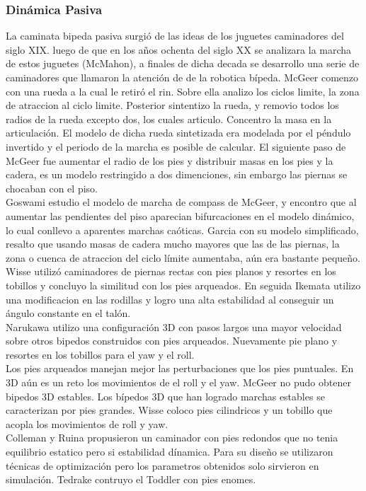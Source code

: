 \documentclass[10pt,onecolumn,twoside,letterpaper]{article}
\begin{document}
\subsubsection{Din\'amica Pasiva}
La caminata bipeda pasiva surgi\'o de las ideas de los juguetes caminadores del siglo XIX. luego de que en los a\~nos ochenta del siglo XX se analizara la marcha de estos juguetes (McMahon), a finales de dicha decada se desarrollo una serie de caminadores que llamaron la atenci\'on de de la robotica b\'ipeda. McGeer comenzo con una rueda a la cual le retir\'o el rin. Sobre ella analizo los ciclos limite, la zona de atraccion al ciclo limite. Posterior sintentizo la rueda, y removio todos los radios de la rueda excepto dos, los cuales articulo. Concentro la masa en la articulaci\'on. El modelo de dicha rueda sintetizada era modelada por el p\'endulo invertido y el periodo de la marcha es posible de calcular. El siguiente paso de McGeer fue aumentar el radio de los pies y distribuir masas en los pies y la cadera, es un modelo restringido a dos dimenciones, sin embargo las piernas se chocaban con el piso.\\
Goswami estudio el modelo de marcha de compass de McGeer, y encontro que al aumentar las pendientes del piso aparecian bifurcaciones en el modelo din\'amico, lo cual conllevo a aparentes marchas ca\'oticas. Garcia con su modelo simplificado, resalto que usando masas de cadera mucho mayores que las de las piernas, la zona o cuenca de atraccion del ciclo l\'imite aumentaba, a\'un era bastante peque\~no.\\
Wisse utiliz\'o caminadores de piernas rectas con pies planos y resortes en los tobillos y concluyo la similitud con los pies arqueados. En seguida Ikemata utilizo una modificacion en las rodillas y logro una alta estabilidad al conseguir un \'angulo constante en el tal\'on.\\
Narukawa utilizo una configuraci\'on 3D con pasos largos una mayor velocidad sobre otros bipedos construidos con pies arqueados. Nuevamente pie plano y resortes en los tobillos para el yaw y el roll.\\
Los pies arqueados manejan mejor las perturbaciones que los pies puntuales. En 3D a\'un es un reto los movimientos de el roll y el yaw. McGeer no pudo obtener bipedos 3D estables. Los b\'ipedos 3D que han logrado marchas estables se caracterizan por pies grandes. Wisse coloco pies cilindricos y un tobillo que acopla los movimientos de roll y yaw.\\
Colleman y Ruina propusieron un caminador con pies redondos que no tenia equilibrio estatico pero si estabilidad d\'inamica. Para su dise\~no se utilizaron t\'ecnicas de optimizaci\'on pero los parametros obtenidos solo sirvieron en simulaci\'on. Tedrake contruyo el Toddler con pies enomes.\\ 
\end{document}
